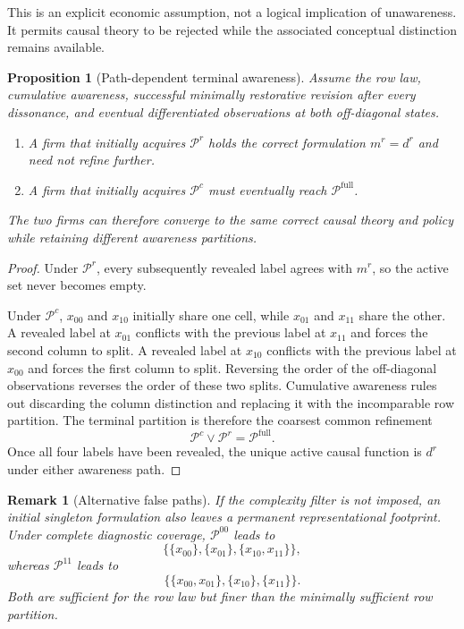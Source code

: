 \documentclass[11pt]{article}
\newtheorem{proposition}[assumption]{Proposition}
\newtheorem{remark}[assumption]{Remark}
\newcommand{\Prow}{\mathcal P^{r}}
\newcommand{\Pcol}{\mathcal P^{c}}
\newcommand{\Pfull}{\mathcal P^{\mathrm{full}}}
\begin{document}
This is an explicit economic assumption, not a logical implication of
unawareness.  It permits causal theory to be rejected while the associated
conceptual distinction remains available.

\begin{proposition}[Path-dependent terminal awareness]
\label{prop:path-dependence}
Assume the row law, cumulative awareness, successful minimally restorative
revision after every dissonance, and eventual differentiated observations at
both off-diagonal states.
\begin{enumerate}[label=(\roman*)]
  \item A firm that initially acquires $\Prow$ holds the correct formulation
  $m^r=d^r$ and need not refine further.
  \item A firm that initially acquires $\Pcol$ must eventually reach
  $\Pfull$.
\end{enumerate}
The two firms can therefore converge to the same correct causal theory and
policy while retaining different awareness partitions.
\end{proposition}

\begin{proof}
Under $\Prow$, every subsequently revealed label agrees with $m^r$, so the
active set never becomes empty.

Under $\Pcol$, $x_{00}$ and $x_{10}$ initially share one cell, while $x_{01}$
and $x_{11}$ share the other.  A revealed label at $x_{01}$ conflicts with the
previous label at $x_{11}$ and forces the second column to split.  A revealed
label at $x_{10}$ conflicts with the previous label at $x_{00}$ and forces the
first column to split.  Reversing the order of the off-diagonal observations
reverses the order of these two splits.  Cumulative awareness rules out
discarding the column distinction and replacing it with the incomparable row
partition.  The terminal partition is therefore the coarsest common refinement
\[
\Pcol\vee\Prow
=
\Pfull.
\]
Once all four labels have been revealed, the unique active causal function is
$d^r$ under either awareness path.
\end{proof}

\begin{remark}[Alternative false paths]
If the complexity filter is not imposed, an initial singleton formulation also
leaves a permanent representational footprint.  Under complete diagnostic
coverage, $\mathcal P^{00}$ leads to
\[
\big\{\{x_{00}\},\{x_{01}\},\{x_{10},x_{11}\}\big\},
\]
whereas $\mathcal P^{11}$ leads to
\[
\big\{\{x_{00},x_{01}\},\{x_{10}\},\{x_{11}\}\big\}.
\]
Both are sufficient for the row law but finer than the minimally sufficient
row partition.
\end{remark}
\end{document}
